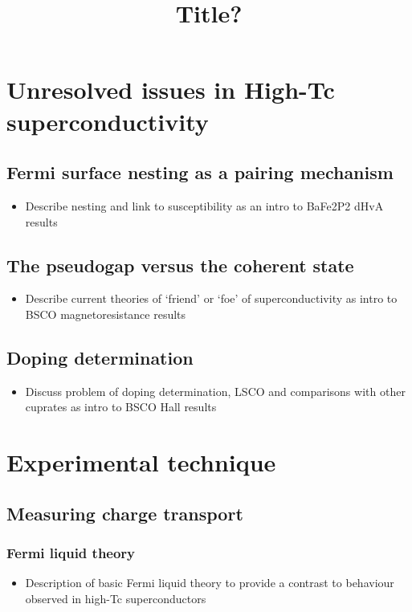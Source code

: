 \documentclass[11pt, a4paper]{article}
\title{Title?}
\begin{document}


\maketitle


\section{Unresolved issues in High-Tc superconductivity}
    \subsection{Fermi surface nesting as a pairing mechanism}
        \begin{itemize}
            \item Describe nesting and link to susceptibility as an intro to BaFe2P2 dHvA results
        \end{itemize}
    \subsection{The pseudogap versus the coherent state}
        \begin{itemize}
            \item Describe current theories of `friend' or `foe' of superconductivity as intro to BSCO magnetoresistance results
        \end{itemize}
    \subsection{Doping determination}
        \begin{itemize}
            \item Discuss problem of doping determination, LSCO and comparisons with other cuprates as intro to BSCO Hall results
        \end{itemize}


\section{Experimental technique}

    \subsection{Measuring charge transport}
        \subsubsection{Fermi liquid theory}
            \begin{itemize}
                \item Description of basic Fermi liquid theory to provide a contrast to behaviour observed in high-Tc superconductors
            \end{itemize}
\end{document}
